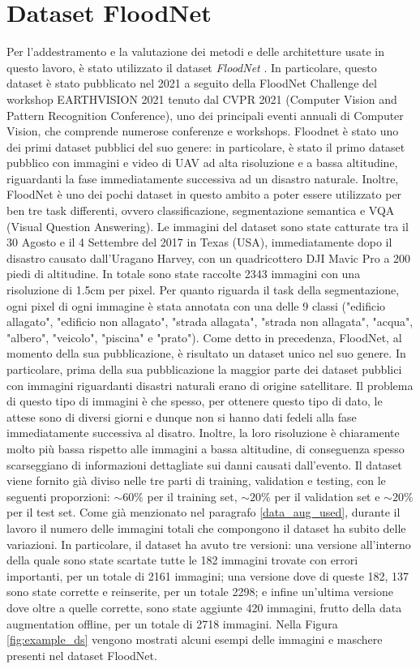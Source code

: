 \section{Dataset FloodNet}
Per l'addestramento e la valutazione dei metodi e delle architetture usate in questo lavoro, è stato utilizzato il dataset \textit{FloodNet} \cite{floodnet}. In particolare, questo dataset è stato pubblicato nel 2021 a seguito della FloodNet Challenge del workshop EARTHVISION 2021 tenuto dal CVPR 2021 (Computer Vision and Pattern Recognition Conference), uno dei principali eventi annuali di Computer Vision, che comprende numerose conferenze e workshops. Floodnet è stato uno dei primi dataset pubblici del suo genere: in particolare, è stato il primo dataset pubblico con immagini e video di UAV ad alta risoluzione e a bassa altitudine, riguardanti la fase immediatamente successiva ad un disastro naturale. Inoltre, FloodNet è uno dei pochi dataset in questo ambito a poter essere utilizzato per ben tre task differenti, ovvero classificazione, segmentazione semantica e VQA (Visual Question Answering).
Le immagini del dataset sono state catturate tra il 30 Agosto e il 4 Settembre del 2017 in Texas (USA), immediatamente dopo il disastro causato dall'Uragano Harvey, con un quadricottero DJI Mavic Pro a 200 piedi di altitudine. In totale sono state raccolte 2343 immagini con una risoluzione di 1.5cm per pixel. Per quanto riguarda il task della segmentazione, ogni  pixel di ogni immagine è stata annotata con una delle 9 classi ("edificio allagato", "edificio non allagato", "strada allagata", "strada non allagata", "acqua", "albero", "veicolo", "piscina" e "prato").
Come detto in precedenza, FloodNet, al momento della sua pubblicazione, è risultato un dataset unico nel suo genere. In particolare, prima della sua pubblicazione la maggior parte dei dataset pubblici con immagini riguardanti disastri naturali erano di origine satellitare. Il problema di questo tipo di immagini è che spesso, per ottenere questo tipo di dato, le attese sono di diversi giorni e dunque non si hanno dati fedeli alla fase immediatamente successiva al disatro. Inoltre, la loro risoluzione è chiaramente molto più bassa rispetto alle immagini a bassa altitudine, di conseguenza spesso scarseggiano di informazioni dettagliate sui danni causati dall'evento. Il dataset viene fornito già diviso nelle tre parti di training, validation e testing, con le seguenti proporzioni: $\sim60\%$ per il training set, $\sim20\%$ per il validation set e $\sim20\%$ per il test set. 
Come già menzionato nel paragrafo \ref{data_aug_used}, durante il lavoro il numero delle immagini totali che compongono il dataset ha subito delle variazioni. In particolare, il dataset ha avuto tre versioni: una versione all'interno della quale sono state scartate tutte le 182 immagini trovate con errori importanti, per un totale di 2161 immagini; una versione dove di queste 182, 137 sono state corrette e reinserite, per un totale 2298; e infine un'ultima versione dove oltre a quelle corrette, sono state aggiunte 420 immagini, frutto della data augmentation offline, per un totale di 2718 immagini. Nella Figura \ref{fig:example_ds} vengono mostrati alcuni esempi delle immagini e maschere presenti nel dataset FloodNet.

